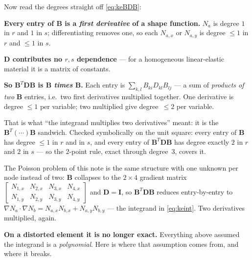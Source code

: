 \documentclass[11pt]{article}
\makeatletter
\newcommand{\ie}{i.e.\@\xspace}
\newcommand{\grad}{\nabla}
\makeatother
\begin{document}
\medskip
\noindent
Now read the degrees straight off \eqref{eq:keBDB}:
\begin{steps}
\item \textbf{Every entry of $\bm{B}$ is a \emph{first derivative} of a shape
      function.} $N_{a}$ is degree $1$ in $r$ and $1$ in $s$; differentiating
      removes one, so each $N_{a,x}$ or $N_{a,y}$ is degree
      $\le1$ in $r$ and $\le1$ in $s$.
\item \textbf{$\bm{D}$ contributes no $r,s$ dependence} --- for a homogeneous
      linear-elastic material it is a matrix of constants.
\item \textbf{So $\bm{B}^{T}\bm{D}\bm{B}$ is $\bm{B}$ \emph{times} $\bm{B}$.}
      Each entry is
      $\sum_{k,l}B_{ki}D_{kl}B_{lj}$ --- a sum of \emph{products of two}
      $\bm{B}$ entries, \ie\ two first derivatives multiplied together. One
      derivative is degree $\le1$ per variable; two multiplied give
      degree~$\le2$ per variable.
\end{steps}

\noindent
That is what ``the integrand multiplies two derivatives'' meant:
it is the $\bm{B}^{T}(\cdots)\bm{B}$ sandwich. Checked symbolically on the
unit square: every entry of $\bm{B}$ has degree $\le1$ in $r$ and in $s$, and
every entry of $\bm{B}^{T}\bm{D}\bm{B}$ has degree exactly $2$ in $r$ and $2$
in $s$ --- so the $2$-point rule, exact through degree~$3$, covers it.

\medskip
\noindent
The Poisson problem of this note is the same structure with one unknown per
node instead of two: $\bm{B}$ collapses to the $2\times4$ gradient matrix
$\left[\begin{smallmatrix}N_{1,x}&N_{2,x}&N_{3,x}&N_{4,x}\\
N_{1,y}&N_{2,y}&N_{3,y}&N_{4,y}\end{smallmatrix}\right]$ and
$\bm{D}=\bm{I}$, so $\bm{B}^{T}\bm{D}\bm{B}$ reduces entry-by-entry to
$\grad N_{a}\cdot\grad N_{b}=N_{a,x}N_{b,x}+N_{a,y}N_{b,y}$ --- the integrand
in \eqref{eq:keint}. Two derivatives multiplied, again.

\medskip
\noindent
\textbf{On a distorted element it is no longer exact.} Everything above
assumed the integrand is a \emph{polynomial}. Here is where that assumption
comes from, and where it breaks.
\end{document}
